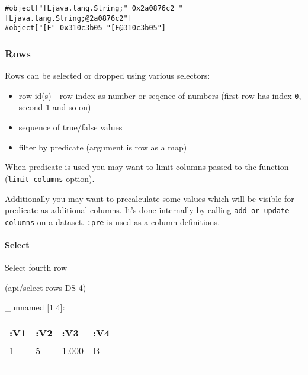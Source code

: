 \documentclass[]{article}
\newenvironment{Shaded}{\begin{snugshade}}{\end{snugshade}}
\newcommand{\DecValTok}[1]{\textcolor[rgb]{0.00,0.00,0.81}{#1}}
\newcommand{\NormalTok}[1]{#1}
\providecommand{\tightlist}{%
  \setlength{\itemsep}{0pt}\setlength{\parskip}{0pt}}
\let\oldparagraph\paragraph
\renewcommand{\paragraph}[1]{\oldparagraph{#1}\mbox{}}
\begin{document}
\begin{verbatim}
#object["[Ljava.lang.String;" 0x2a0876c2 "[Ljava.lang.String;@2a0876c2"]
#object["[F" 0x310c3b05 "[F@310c3b05"]
\end{verbatim}

\subsubsection{Rows}\label{rows}

Rows can be selected or dropped using various selectors:

\begin{itemize}
\tightlist
\item
  row id(s) - row index as number or seqence of numbers (first row has
  index \texttt{0}, second \texttt{1} and so on)
\item
  sequence of true/false values
\item
  filter by predicate (argument is row as a map)
\end{itemize}

When predicate is used you may want to limit columns passed to the
function (\texttt{limit-columns} option).

Additionally you may want to precalculate some values which will be
visible for predicate as additional columns. It's done internally by
calling \texttt{add-or-update-columns} on a dataset. \texttt{:pre} is
used as a column definitions.

\paragraph{Select}\label{select-1}

Select fourth row

\begin{Shaded}
\begin{Highlighting}[]
\NormalTok{(api/select-rows DS }\DecValTok{4}\NormalTok{)}
\end{Highlighting}
\end{Shaded}

\_unnamed {[}1 4{]}:

\begin{longtable}[]{@{}llll@{}}
\toprule
:V1 & :V2 & :V3 & :V4\tabularnewline
\midrule
\endhead
1 & 5 & 1.000 & B\tabularnewline
\bottomrule
\end{longtable}

\begin{center}\rule{0.5\linewidth}{0.5pt}\end{center}
\end{document}
